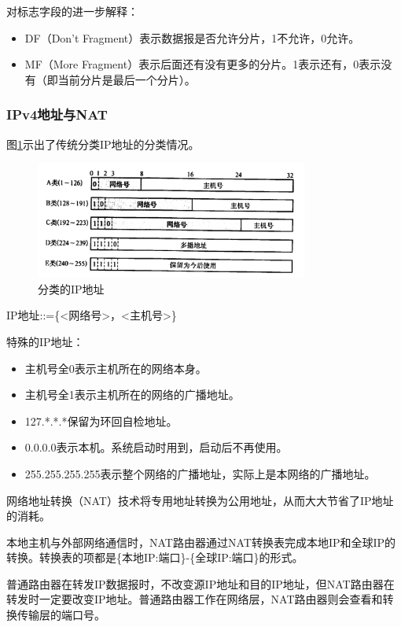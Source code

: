 \documentclass[12pt, a4paper, oneside]{ctexart}
\begin{document}
对标志字段的进一步解释：
\begin{itemize}
    \item DF（Don't Fragment）表示数据报是否允许分片，1不允许，0允许。
    \item MF（More Fragment）表示后面还有没有更多的分片。1表示还有，0表示没有（即当前分片是最后一个分片）。
\end{itemize}

\subsubsection{IPv4地址与NAT}

图\ref{ip_classes}示出了传统分类IP地址的分类情况。

\begin{figure}[h]
    \centering
    \includegraphics[width=0.8\textwidth]{./images/ip_address.png}
    \caption{分类的IP地址}
    \label{ip_classes}
\end{figure}

IP地址::=\{<网络号>，<主机号>\}

特殊的IP地址：
\begin{itemize}
    \item 主机号全0表示主机所在的网络本身。
    \item 主机号全1表示主机所在的网络的广播地址。
    \item 127.*.*.*保留为环回自检地址。
    \item 0.0.0.0表示本机。系统启动时用到，启动后不再使用。
    \item 255.255.255.255表示整个网络的广播地址，实际上是本网络的广播地址。
\end{itemize}

网络地址转换（NAT）技术将专用地址转换为公用地址，从而大大节省了IP地址的消耗。

本地主机与外部网络通信时，NAT路由器通过NAT转换表完成本地IP和全球IP的转换。转换表的项都是\{本地IP:端口\}-\{全球IP:端口\}的形式。

普通路由器在转发IP数据报时，不改变源IP地址和目的IP地址，但NAT路由器在转发时一定要改变IP地址。普通路由器工作在网络层，NAT路由器则会查看和转换传输层的端口号。
\end{document}
